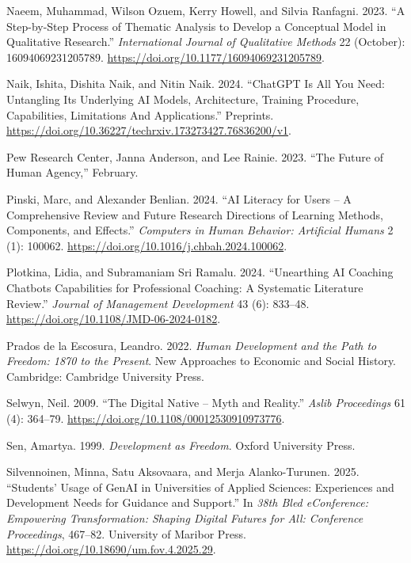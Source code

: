 \documentclass[
  letterpaper,
  DIV=11,
  numbers=noendperiod]{scrartcl}
\newlength{\cslhangindent}
\newenvironment{CSLReferences}[2] %
 {\begin{list}{}{%
  \setlength{\itemindent}{0pt}
  \setlength{\leftmargin}{0pt}
  \setlength{\parsep}{0pt}
  \ifodd #1
   \setlength{\leftmargin}{\cslhangindent}
   \setlength{\itemindent}{-1\cslhangindent}
  \fi
  \setlength{\itemsep}{#2\baselineskip}}}
 {\end{list}}
\begin{document}
\begin{CSLReferences}{1}{0}
Naeem, Muhammad, Wilson Ozuem, Kerry Howell, and Silvia Ranfagni. 2023.
{``A {Step-by-Step Process} of {Thematic Analysis} to {Develop} a
{Conceptual Model} in {Qualitative Research}.''} \emph{International
Journal of Qualitative Methods} 22 (October): 16094069231205789.
\url{https://doi.org/10.1177/16094069231205789}.

Naik, Ishita, Dishita Naik, and Nitin Naik. 2024. {``{ChatGPT Is All You
Need}: {Untangling Its Underlying AI Models}, {Architecture}, {Training
Procedure}, {Capabilities}, {Limitations And Applications}.''}
Preprints.
\url{https://doi.org/10.36227/techrxiv.173273427.76836200/v1}.

Pew Research Center, Janna Anderson, and Lee Rainie. 2023. {``The
{Future} of {Human Agency},''} February.

Pinski, Marc, and Alexander Benlian. 2024. {``{AI} Literacy for Users --
{A} Comprehensive Review and Future Research Directions of Learning
Methods, Components, and Effects.''} \emph{Computers in Human Behavior:
Artificial Humans} 2 (1): 100062.
\url{https://doi.org/10.1016/j.chbah.2024.100062}.

Plotkina, Lidia, and Subramaniam Sri Ramalu. 2024. {``Unearthing {AI}
Coaching Chatbots Capabilities for Professional Coaching: A Systematic
Literature Review.''} \emph{Journal of Management Development} 43 (6):
833--48. \url{https://doi.org/10.1108/JMD-06-2024-0182}.

Prados de la Escosura, Leandro. 2022. \emph{Human Development and the
Path to Freedom: 1870 to the Present}. New Approaches to Economic and
Social History. Cambridge: Cambridge University Press.

Selwyn, Neil. 2009. {``The Digital Native -- Myth and Reality.''}
\emph{Aslib Proceedings} 61 (4): 364--79.
\url{https://doi.org/10.1108/00012530910973776}.

Sen, Amartya. 1999. \emph{Development as {Freedom}}. Oxford University
Press.

Silvennoinen, Minna, Satu Aksovaara, and Merja Alanko-Turunen. 2025.
{``Students' {Usage} of {GenAI} in {Universities} of {Applied Sciences}:
{Experiences} and {Development Needs} for {Guidance} and {Support}.''}
In \emph{38th {Bled eConference}: {Empowering Transformation}: {Shaping
Digital Futures} for {All}: {Conference Proceedings}}, 467--82.
University of Maribor Press.
\url{https://doi.org/10.18690/um.fov.4.2025.29}.


\end{CSLReferences}
\end{document}
